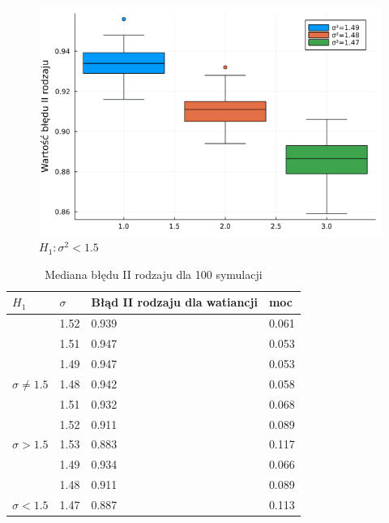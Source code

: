 \documentclass{article}
\theoremstyle{break}
\begin{document}
\begin{figure}[H]
\begin{multicols}{3}
		\caption{$H_1: \sigma^2>1.5$}
		\label{fig:13}
		\includegraphics[scale=0.25]{Z3.war3.png}
		\caption{$H_1: \sigma^2<1.5$}
		\label{fig:14}
\end{multicols}
\end{figure}

\begin{table}[H]
	\begin{center}
		\begin{tabular}{|l|l|l|l|}
\hline
\rowcolor[HTML]{EFEFEF} 
$H_1$                               & $\sigma$   & Błąd II rodzaju dla watiancji & moc   \\ \hline
& 1.52 & 0.939                        & 0.061 \\ \cline{2-4} 
& 1.51 & 0.947                        & 0.053 \\ \cline{2-4} 
& 1.49 & 0.947                        & 0.053 \\ \cline{2-4} 
{$\sigma\ne1.5$}             & 1.48 & 0.942                        & 0.058 \\ \hline
& 1.51 & 0.932                        & 0.068 \\ \cline{2-4} 
& 1.52 & 0.911                        & 0.089 \\ \cline{2-4} 
{$\sigma>1.5$} & 1.53 & 0.883                        & 0.117 \\ \hline
& 1.49 & 0.934                        & 0.066 \\ \cline{2-4} 
& 1.48 & 0.911                        & 0.089 \\ \cline{2-4} 
{$\sigma<1.5$}    & 1.47 & 0.887                        & 0.113 \\ \hline
		\end{tabular}
		\caption{Mediana błędu II rodzaju dla 100 symulacji}
		\label{table:4}
	\end{center}
\end{table}
\end{document}
